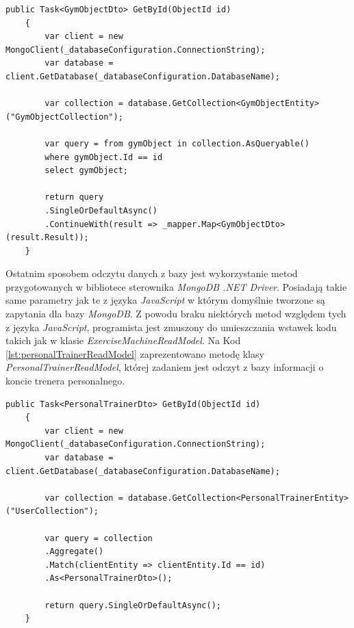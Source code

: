 \documentclass[a4paper,twoside,12pt]{book}
\begin{document}
\begin{lstlisting}[caption={Metoda odczytu danych z kolekcji \textit{GymObjectCollection} przy wykorzystaniu wstawek składni \textit{LINQ}}, label={lst:gymObjectReadModel}]
	public Task<GymObjectDto> GetById(ObjectId id)
	{
		var client = new MongoClient(_databaseConfiguration.ConnectionString);
		var database = client.GetDatabase(_databaseConfiguration.DatabaseName);
		
		var collection = database.GetCollection<GymObjectEntity>("GymObjectCollection");
		
		var query = from gymObject in collection.AsQueryable()
		where gymObject.Id == id
		select gymObject;
		
		return query
		.SingleOrDefaultAsync()
		.ContinueWith(result => _mapper.Map<GymObjectDto>(result.Result));
	}
\end{lstlisting}

Ostatnim sposobem odczytu danych z bazy jest wykorzystanie metod przygotowanych w bibliotece sterownika \textit{MongoDB .NET Driver}. Posiadają takie same parametry jak te z języka \textit{JavaScript} w którym domyślnie tworzone są zapytania dla bazy \textit{MongoDB}. Z powodu braku niektórych metod względem tych z języka \textit{JavaScript}, programista jest zmuszony do umieszczania wstawek kodu takich jak w klasie \textit{ExerciseMachineReadModel}. Na Kod \ref{lst:personalTrainerReadModel} zaprezentowano metodę klasy 
\textit{PersonalTrainerReadModel}, której zadaniem jest odczyt z bazy informacji o koncie trenera personalnego.
\begin{lstlisting}[caption={Metoda odczytu informacji o koncie trenera personalnego przy wykorzystaniu wstawek składni metod sterownika}, label={lst:personalTrainerReadModel}]
	public Task<PersonalTrainerDto> GetById(ObjectId id)
	{
		var client = new MongoClient(_databaseConfiguration.ConnectionString);
		var database = client.GetDatabase(_databaseConfiguration.DatabaseName);
		
		var collection = database.GetCollection<PersonalTrainerEntity>("UserCollection");
		
		var query = collection
		.Aggregate()
		.Match(clientEntity => clientEntity.Id == id)
		.As<PersonalTrainerDto>();
		
		return query.SingleOrDefaultAsync();
	}
\end{lstlisting}
\end{document}
